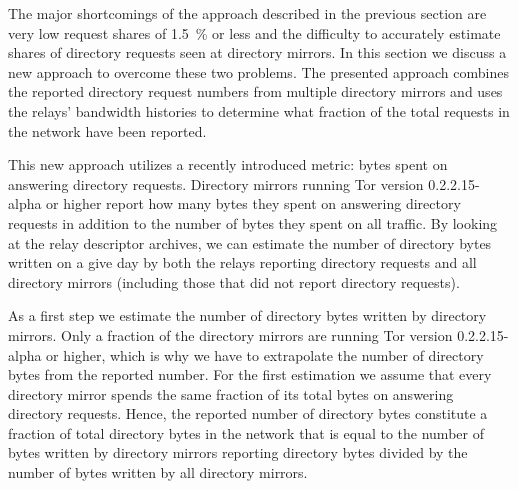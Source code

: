 \documentclass{article}
\begin{document}
The major shortcomings of the approach described in the previous section
are very low request shares of 1.5~\% or less and the difficulty to
accurately estimate shares of directory requests seen at directory mirrors.
In this section we discuss a new approach to overcome these two problems.
The presented approach combines the reported directory request numbers
from multiple directory mirrors and uses the relays' bandwidth histories
to determine what fraction of the total requests in the network have been
reported.

This new approach utilizes a recently introduced metric: bytes spent on
answering directory requests.
Directory mirrors running Tor version 0.2.2.15-alpha or higher report
how many bytes they spent on answering directory requests in addition to
the number of bytes they spent on all traffic.
By looking at the relay descriptor archives, we can estimate the number of
directory bytes written on a give day by both the relays reporting directory requests and all
directory mirrors (including those that did not report directory requests).

As a first step we estimate the number of directory bytes written by
directory mirrors.
Only a fraction of the directory mirrors are running Tor version
0.2.2.15-alpha or higher, which is why we have to extrapolate the number
of directory bytes from the reported number.
For the first estimation we assume that every directory mirror spends the
same fraction of its total bytes on answering directory requests.
Hence, the reported number of directory bytes constitute a fraction of
total directory bytes in the network that is equal to the number of bytes
written by directory mirrors reporting directory bytes divided by the
number of bytes written by all directory mirrors.
%
%
\end{document}
